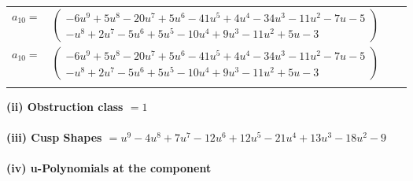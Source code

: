 \documentclass[1p]{elsarticle_modified}
\theoremstyle{definition}
\begin{document}
\begin{tabular}{m{7pt} m{180pt} m{7pt} m{180pt} }
\flushright $a_{10}=$&$\begin{pmatrix}-6 u^9+5 u^8-20 u^7+5 u^6-41 u^5+4 u^4-34 u^3-11 u^2-7 u-5\\- u^8+2 u^7-5 u^6+5 u^5-10 u^4+9 u^3-11 u^2+5 u-3\end{pmatrix}$\\ \flushright $a_{10}=$&$\begin{pmatrix}-6 u^9+5 u^8-20 u^7+5 u^6-41 u^5+4 u^4-34 u^3-11 u^2-7 u-5\\- u^8+2 u^7-5 u^6+5 u^5-10 u^4+9 u^3-11 u^2+5 u-3\end{pmatrix}$\\&\end{tabular}
\flushleft \textbf{(ii) Obstruction class $= 1$}\\~\\
\flushleft \textbf{(iii) Cusp Shapes $= u^9-4 u^8+7 u^7-12 u^6+12 u^5-21 u^4+13 u^3-18 u^2-9$}\\~\\
\newpage\renewcommand{\arraystretch}{1}
\flushleft \textbf{(iv) u-Polynomials at the component}\newline \\
\end{document}
